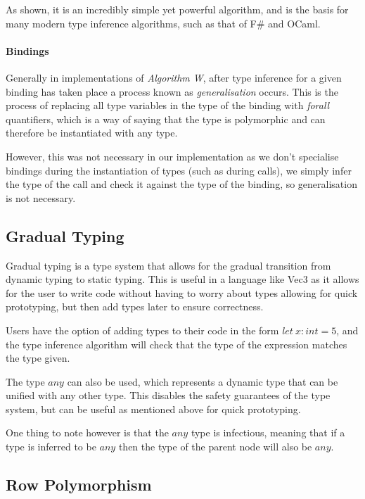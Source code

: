 As shown, it is an incredibly simple yet powerful algorithm, and is the basis for many modern type inference
algorithms, such as that of F\# and OCaml.

\paragraph{Bindings}\label{par:bindings}
Generally in implementations of \textit{Algorithm W}, after type inference for a given binding has taken place a
process known as \textit{generalisation} occurs.
This is the process of replacing all type variables in the type of
the binding with \textit{forall} quantifiers, which is a way of saying that the type is polymorphic and can therefore be
instantiated with any type.

However, this was not necessary in our implementation as we don't specialise bindings during the instantiation of
types (such as during calls), we simply infer the type of the call and check it against the type of the binding, so
generalisation is not necessary.

\subsection{Gradual Typing}\label{subsec:gradual-typing}

Gradual typing is a type system that allows for the gradual transition from dynamic typing to static typing.
This is useful in a language like Vec3 as it allows for the user to write code without having to worry about types
allowing for quick prototyping, but then add types later to ensure correctness.

Users have the option of adding types to their code in the form $let\ x: int = 5$, and the type inference algorithm
will check that the type of the expression matches the type given.

The type $any$ can also be used, which represents a dynamic type that can be unified with any other type.
This disables the safety guarantees of the type system, but can be useful as mentioned above for quick prototyping.

One thing to note however is that the $any$ type is infectious, meaning that if a type is inferred to be $any$ then
the type of the parent node will also be $any$.

\subsection{Row Polymorphism}\label{subsec:row-polymorphism}


